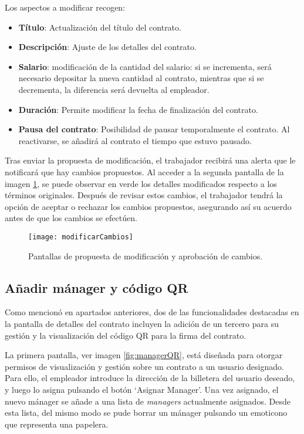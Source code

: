 Los aspectos a modificar recogen:
\begin{itemize}

\item \textbf{Título}: Actualización del título del contrato.

\item \textbf{Descripción}: Ajuste de los detalles del contrato.

\item \textbf{Salario}: modificación de la cantidad del salario: si se incrementa, será necesario depositar la nueva cantidad al contrato, mientras que si se decrementa, la diferencia será devuelta al empleador. 

\item \textbf{Duración}: Permite modificar la fecha de finalización del contrato.

\item \textbf{Pausa del contrato}: Posibilidad de pausar temporalmente el contrato. Al reactivarse, se añadirá al contrato el tiempo que estuvo pausado.

\end{itemize}

Tras enviar la propuesta de modificación, el trabajador recibirá una alerta que le notificará que hay cambios propuestos. Al acceder a la segunda pantalla de la imagen \ref{fig:modificarCambios}, se puede observar en verde los detalles modificados respecto a los términos originales. Después de revisar estos cambios, el trabajador tendrá la opción de aceptar o rechazar los cambios propuestos, asegurando así su acuerdo antes de que los cambios se efectúen.

\begin{figure}[h]
	\centering
	\texttt{[image: modificarCambios]}
	\caption[Pantalla modificar contrato]{Pantallas de propuesta de modificación y aprobación de cambios.}
	\label{fig:modificarCambios}
\end{figure}


\subsection{Añadir mánager y código QR}

Como mencionó en apartados anteriores, dos de las funcionalidades destacadas en la pantalla de detalles del contrato incluyen la adición de un tercero para su gestión y la visualización del código QR para la firma del contrato.

La primera pantalla, ver imagen \ref{fig:managerQR}, está diseñada para otorgar permisos de visualización y gestión sobre un contrato a un usuario designado.
Para ello, el empleador introduce la dirección de la billetera del usuario deseado, y luego lo asigna pulsando el botón `Asignar Manager'.
Una vez asignado, el nuevo mánager se añade a una lista de \textit{managers} actualmente asignados. Desde esta lista, del mismo modo se pude borrar un mánager pulsando un emoticono que representa una papelera.

